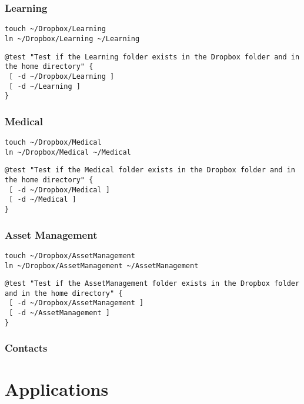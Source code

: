 \documentclass[11pt]{article}
\begin{document}
\subsubsection{Learning}
\label{sec:org2d91bb6}
\begin{verbatim}
touch ~/Dropbox/Learning
ln ~/Dropbox/Learning ~/Learning
\end{verbatim}

\begin{verbatim}
@test "Test if the Learning folder exists in the Dropbox folder and in the home directory" {
 [ -d ~/Dropbox/Learning ]
 [ -d ~/Learning ]
}
\end{verbatim}

\subsubsection{Medical}
\label{sec:org7dea7c5}
\begin{verbatim}
touch ~/Dropbox/Medical
ln ~/Dropbox/Medical ~/Medical
\end{verbatim}

\begin{verbatim}
@test "Test if the Medical folder exists in the Dropbox folder and in the home directory" {
 [ -d ~/Dropbox/Medical ]
 [ -d ~/Medical ]
}
\end{verbatim}

\subsubsection{Asset Management}
\label{sec:org3f5b26c}
\begin{verbatim}
touch ~/Dropbox/AssetManagement
ln ~/Dropbox/AssetManagement ~/AssetManagement
\end{verbatim}

\begin{verbatim}
@test "Test if the AssetManagement folder exists in the Dropbox folder and in the home directory" {
 [ -d ~/Dropbox/AssetManagement ]
 [ -d ~/AssetManagement ]
}
\end{verbatim}

\subsubsection{Contacts}
\label{sec:org975b4c0}

\section{Applications}
\label{sec:org5b04dac}
\end{document}
